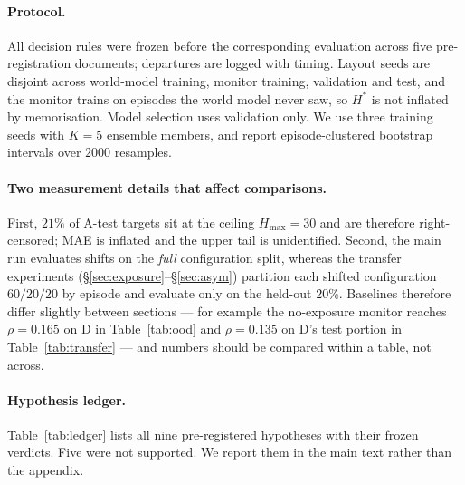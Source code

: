 \documentclass[twocolumn,10pt]{article}
\newcommand{\Hstar}{H^{*}}
\begin{document}
\paragraph{Protocol.}
All decision rules were frozen before the corresponding evaluation across five
pre-registration documents; departures are logged with timing. Layout seeds are disjoint across
world-model training, monitor training, validation and test, and the monitor trains on episodes
the world model never saw, so $\Hstar$ is not inflated by memorisation. Model selection uses
validation only. We use three training seeds with $K=5$ ensemble members, and report
episode-clustered bootstrap intervals over $2000$ resamples.

\paragraph{Two measurement details that affect comparisons.}
First, $21\%$ of A-test targets sit at the ceiling $H_{\max}=30$ and are therefore
right-censored; MAE is inflated and the upper tail is unidentified. Second, the main run
evaluates shifts on the \emph{full} configuration split, whereas the transfer experiments
(\S\ref{sec:exposure}--\S\ref{sec:asym}) partition each shifted configuration $60/20/20$ by
episode and evaluate only on the held-out $20\%$. Baselines therefore differ slightly between
sections --- for example the no-exposure monitor reaches $\rho = 0.165$ on D in
Table~\ref{tab:ood} and $\rho = 0.135$ on D's test portion in Table~\ref{tab:transfer} --- and
numbers should be compared within a table, not across.

\paragraph{Hypothesis ledger.}
Table~\ref{tab:ledger} lists all nine pre-registered hypotheses with their frozen verdicts.
Five were not supported. We report them in the main text rather than the appendix.

\begin{table}[t]
\centering\footnotesize
\resizebox{\textwidth}{!}{}
\caption{All pre-registered hypotheses and their frozen verdicts. H4 is labelled a weak test
because the planning task's compute--performance frontier turned out to be monotone, leaving no
interior optimum for an adaptive horizon to find. H8/H9 withdrew a proposed shift-type
taxonomy; \S\ref{sec:asym} reports the asymmetry the data support instead.}
\label{tab:ledger}
\end{table}
\end{document}
